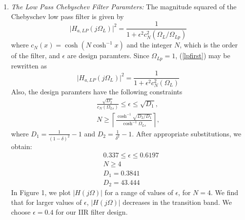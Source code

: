 \documentclass[article]{IEEEtran}
\theoremstyle{remark}
\numberwithin{equation}{subsection}
\begin{document}
\begin{enumerate}
\item {\em The Low Pass Chebyschev Filter Paramters:}  The magnitude squared of the Chebyschev low pass filter is given by 
\begin{equation}
\label{lpfirst}
\vert H_{a,LP}(j\Omega_L)\vert^2 = \frac{1}{1 + \epsilon^2c_N^2(\Omega_L/\Omega_{Lp})}
\end{equation}
where $c_N(x) = \cosh(N \cosh^{-1}x)$ and the integer $N$, which is the order of the filter, and $\epsilon$ are design paramters.  Since $\Omega_{Lp} = 1$, (\ref{lpfirst}) may be rewritten as
\begin{equation}
\label{lpsecond}
\vert H_{a,LP}(j\Omega_L)\vert^2 = \frac{1}{1 + \epsilon^2c_N^2(\Omega_L)}
\end{equation}
Also, the design paramters have the following constraints
\begin{eqnarray}
\label{lpdesign}
\frac{\sqrt{D_2}}{c_N(\Omega_{Ls})} \leq \epsilon \leq \sqrt{D_1}, \nonumber \\
N \geq \left\lceil \frac{\cosh^{-1}\sqrt{D_2/D_1}}{\cosh^{-1}\Omega_{Ls}} \right\rceil,
\end{eqnarray}
where $D_1 = \frac{1}{(1 - \delta)^2}-1$ and $D_2 = \frac{1}{\delta^2} - 1$.  After appropriate substitutions,
we obtain:
\begin{align}
    &0.337 \leq \epsilon \leq 0.6197\\
    &N \geq 4 \\
    &D_1 = 0.3841\\
    &D_2 = 43.444
\end{align}
  In Figure 1, we plot $\vert H(j\Omega)\vert$ for a range of values of $\epsilon$, for $N = 4$. We find that for larger values of $\epsilon$, $|H(j\Omega)|$ decreases in the transition band.  We choose $\epsilon = 0.4$  for our IIR filter design.  



\end{enumerate}
\end{document}
